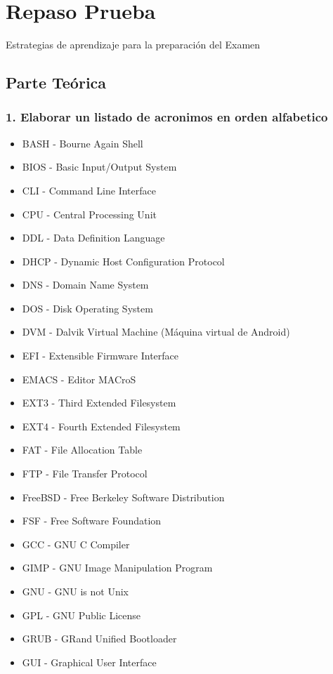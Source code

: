 \documentclass[11pt,twoside]{book}
\begin{document}
\section{Repaso Prueba}
Estrategias de aprendizaje para la preparación del Examen

\subsection{Parte Teórica}

\subsubsection{1. Elaborar un listado de acronimos en orden alfabetico}

\begin{itemize}
   \item BASH - Bourne Again Shell
\item BIOS - Basic Input/Output System
\item CLI - Command Line Interface
\item CPU - Central Processing Unit
\item DDL - Data Definition Language
\item DHCP - Dynamic Host Configuration Protocol
\item DNS - Domain Name System
\item DOS - Disk Operating System
\item DVM - Dalvik Virtual Machine (Máquina virtual de Android)
\item EFI - Extensible Firmware Interface
\item EMACS - Editor MACroS
\item EXT3 - Third Extended Filesystem
\item EXT4 - Fourth Extended Filesystem
\item FAT - File Allocation Table
\item FTP - File Transfer Protocol
\item FreeBSD - Free Berkeley Software Distribution
\item FSF - Free Software Foundation
\item GCC - GNU C Compiler
\item GIMP - GNU Image Manipulation Program
\item GNU - GNU is not Unix
\item GPL - GNU Public License
\item GRUB - GRand Unified Bootloader
\item GUI - Graphical User Interface

\end{itemize}
\end{document}
